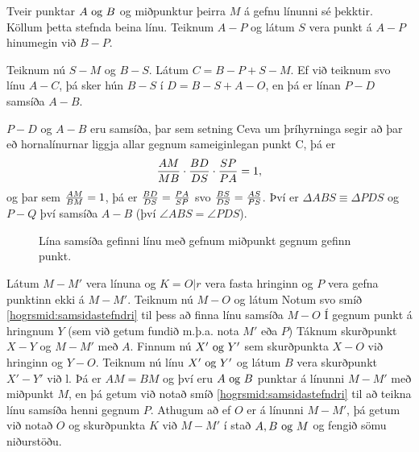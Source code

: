 \begin{frame}[allowframebreaks]
  \begin{hogrsmid} \label{hogrsmid:samsidastefndri}
    Tveir punktar \(A \text{ og } B\) og miðpunktur þeirra \(M\) á gefnu línunni sé þekktir.
    Köllum þetta stefnda beina línu.
    Teiknum \(A-P\) og látum \(S\) vera punkt á \(A-P\) hinumegin við \(B-P\).

    Teiknum nú \(S-M\) og \(B-S\). Látum \(C = B-P+ S-M\).
    Ef við teiknum svo línu \(A-C\), þá sker hún \(B-S\) í
    \(D = B-S + A-O\), en þá er línan \(P-D\) samsíða \(A-B\).
    
    \theorembreak
    \(P-D\) og \(A-B\) eru samsíða, þar sem
    setning Ceva \cite{WikiCeva} um þríhyrninga segir að þar eð
    hornalínurnar liggja allar gegnum sameiginlegan punkt C, þá er
    \[\frac{AM}{MB} \cdot \frac{BD}{DS} \cdot \frac{SP}{PA} = 1,\]
    og þar sem \(\frac{AM}{BM} = 1\), þá  er \(\frac{BD}{DS}= \frac{PA}{SP} \)
    svo \(\frac{BS}{DS}=\frac{AS}{PS}\). Því er \(\Delta ABS \equiv \Delta PDS\)
    og \(P-Q\) því samsíða \(A-B\) (því \(\angle ABS = \angle PDS\)).
  \end{hogrsmid}
\end{frame}

\begin{frame}
  \begin{figure}[H]
    \centering
    \ifglaerur
    
    \else
    
    \fi
    \caption{Lína samsíða gefinni línu með gefnum miðpunkt gegnum gefinn punkt.}
    \label{fig:samsida}
  \end{figure}
\end{frame}

\begin{frame}
  \begin{hogrsmid} \label{hogrsmid:samsida}
    Látum \(M-M'\) vera línuna og \(K = O|r\) vera fasta hringinn og \(P\)
    vera gefna punktinn ekki á \(M-M'\).
    Teiknum nú \(M-O\) og látum
    Notum svo smíð \ref{hogrsmid:samsidastefndri} til þess
    að finna línu samsíða \(M-O\) Í gegnum punkt á hringnum \(Y\)
    (sem við getum fundið m.þ.a. nota \(M'\) eða \(P\))
    Táknum skurðpunkt \(X-Y\) og \(M-M'\) með \(A\).
    Finnum nú \(X' \text{ og } Y'\) sem skurðpunkta \(X-O\) við hringinn og \(Y-O\).
    Teiknum nú línu \(X' \text{ og } Y'\) og látum \(B\) vera skurðpunkt \(X'-Y'\) við l.
    Þá er \(AM = BM\) og því eru \(A \text{ og } B\) punktar á línunni \(M-M'\) með miðpunkt
    \(M\), en þá getum við notað smíð \ref{hogrsmid:samsidastefndri}
    til að teikna línu samsíða henni gegnum \(P\).
    Athugum að ef \(O\) er á línunni \(M-M'\), þá getum við  notað
    \(O\) og skurðpunkta \(K\) við \(M-M'\) í stað \(A, B \text{ og } M\) og fengið
    sömu niðurstöðu.
  \end{hogrsmid}
\end{frame}

